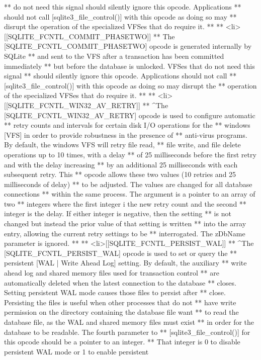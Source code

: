 \begin{Codex}[label=sqlite3.h,numbers=left]
{** do not need this signal should silently ignore this opcode. Applications 
** should not call [sqlite3_file_control()] with this opcode as doing so may 
** disrupt the operation of the specialized VFSes that do require it.  
**
** <li>[[SQLITE_FCNTL_COMMIT_PHASETWO]]
** The [SQLITE_FCNTL_COMMIT_PHASETWO] opcode is generated internally by SQLite
** and sent to the VFS after a transaction has been committed immediately
** but before the database is unlocked. VFSes that do not need this signal
** should silently ignore this opcode. Applications should not call
** [sqlite3_file_control()] with this opcode as doing so may disrupt the 
** operation of the specialized VFSes that do require it.  
**
** <li>[[SQLITE_FCNTL_WIN32_AV_RETRY]]
** ^The [SQLITE_FCNTL_WIN32_AV_RETRY] opcode is used to configure automatic
** retry counts and intervals for certain disk I/O operations for the
** windows [VFS] in order to provide robustness in the presence of
** anti-virus programs.  By default, the windows VFS will retry file read,
** file write, and file delete operations up to 10 times, with a delay
** of 25 milliseconds before the first retry and with the delay increasing
** by an additional 25 milliseconds with each subsequent retry.  This
** opcode allows these two values (10 retries and 25 milliseconds of delay)
** to be adjusted.  The values are changed for all database connections
** within the same process.  The argument is a pointer to an array of two
** integers where the first integer i the new retry count and the second
** integer is the delay.  If either integer is negative, then the setting
** is not changed but instead the prior value of that setting is written
** into the array entry, allowing the current retry settings to be
** interrogated.  The zDbName parameter is ignored.
**
** <li>[[SQLITE_FCNTL_PERSIST_WAL]]
** ^The [SQLITE_FCNTL_PERSIST_WAL] opcode is used to set or query the
** persistent [WAL | Write Ahead Log] setting.  By default, the auxiliary
** write ahead log and shared memory files used for transaction control
** are automatically deleted when the latest connection to the database
** closes.  Setting persistent WAL mode causes those files to persist after
** close.  Persisting the files is useful when other processes that do not
** have write permission on the directory containing the database file want
** to read the database file, as the WAL and shared memory files must exist
** in order for the database to be readable.  The fourth parameter to
** [sqlite3_file_control()] for this opcode should be a pointer to an integer.
** That integer is 0 to disable persistent WAL mode or 1 to enable persistent
}
\end{Codex}
